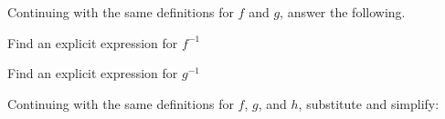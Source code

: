 Continuing with the same definitions for $f$ and $g$, answer the following.

\begin{ProblemSet}[pencil space=3.5in]
 \begin{Problem}
  Find an explicit expression for $f^{-1}$
 \end{Problem}
 \begin{Problem}
  Find an explicit expression for $g^{-1}$
 \end{Problem}
\end{ProblemSet}


\newpage
{}

Continuing with the same definitions for $f$, $g$, and $h$, substitute and simplify:

\begin{multicols}{2}
 \begin{ProblemSet}[pencil space=0in]
 \end{ProblemSet}
\end{multicols}


